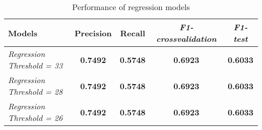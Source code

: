 \begin{table} [ht]
\begin{tabular}{lcccc}
\toprule
Models & Precision & Recall & \textit{F1-crossvalidation} & \textit{F1-test}  \\
\midrule
\textit{Regression Threshold = 33 } & \textbf{0.7492} & \textbf{0.5748} & \textbf{0.6923} & \textbf{0.6033} \\
\textit{Regression Threshold = 28 } & \textbf{0.7492} & \textbf{0.5748} & \textbf{0.6923} & \textbf{0.6033} \\
\textit{Regression Threshold = 26 } & \textbf{0.7492} & \textbf{0.5748} & \textbf{0.6923} & \textbf{0.6033} \\
\bottomrule
\end{tabular}
\caption{Performance of regression models}
\label{table:results_2}
\end{table}







